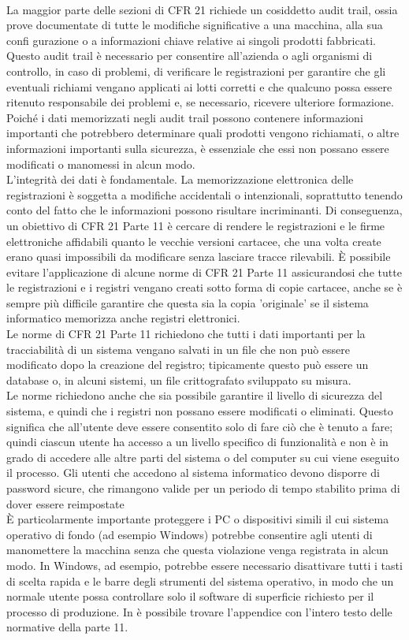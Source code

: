 \documentclass[12pt, a4paper, oneside]{book}
\begin{document}
\\La maggior parte delle sezioni di CFR 21 richiede un cosiddetto audit trail, ossia prove documentate di tutte le modifiche significative a una macchina, alla sua confi gurazione o a informazioni chiave relative ai singoli prodotti fabbricati. Questo audit trail è necessario per consentire all'azienda o agli organismi di controllo, in caso di problemi, di verificare le registrazioni per garantire che gli eventuali richiami vengano applicati ai lotti corretti e che qualcuno possa essere ritenuto responsabile dei problemi e, se necessario, ricevere ulteriore formazione. Poiché i dati memorizzati negli audit trail possono contenere informazioni importanti che potrebbero determinare quali prodotti vengono richiamati, o altre informazioni importanti sulla sicurezza, è essenziale che essi non possano essere modificati o manomessi in alcun modo. \\L'integrità dei dati è fondamentale. La memorizzazione elettronica delle registrazioni è soggetta a modifiche accidentali o intenzionali, soprattutto tenendo conto del fatto che le informazioni possono risultare incriminanti. Di conseguenza, un obiettivo di CFR 21 Parte 11 è cercare di rendere le registrazioni e le firme elettroniche affidabili quanto le vecchie versioni cartacee, che una volta create erano quasi impossibili da modificare senza lasciare tracce rilevabili. È possibile evitare l'applicazione di alcune norme di CFR 21 Parte 11 assicurandosi che tutte le registrazioni e i registri vengano creati sotto forma di copie cartacee, anche se è sempre più difficile garantire che questa sia la copia 'originale' se il sistema informatico memorizza anche registri elettronici. \\Le norme di CFR 21 Parte 11 richiedono che tutti i dati importanti per la tracciabilità di un sistema vengano salvati in un file che non può essere modificato dopo la creazione del registro; tipicamente questo può essere un database o, in alcuni sistemi, un file crittografato sviluppato su misura. \\Le norme richiedono anche che sia possibile garantire il livello di sicurezza del sistema, e quindi che i registri non possano essere modificati o eliminati. Questo significa che all'utente deve essere consentito solo di fare ciò che è tenuto a fare; quindi ciascun utente ha accesso a un livello specifico di funzionalità e non è in grado di accedere alle altre parti del sistema o del computer su cui viene eseguito il processo. Gli utenti che accedono al sistema informatico devono disporre
di password sicure, che rimangono valide per un periodo di tempo stabilito prima di dover essere reimpostate \\
È particolarmente importante proteggere i PC o dispositivi simili il cui sistema operativo di fondo (ad esempio Windows) potrebbe consentire agli utenti di manomettere la macchina senza che questa violazione venga registrata in alcun modo. In Windows, ad esempio, potrebbe essere necessario disattivare tutti i tasti di scelta rapida e le barre degli strumenti del sistema operativo, in modo che un normale utente possa controllare solo il software di superficie richiesto per il processo di produzione. In \cite{CFR} è possibile trovare l'appendice con l'intero testo delle normative della parte 11.
\end{document}
